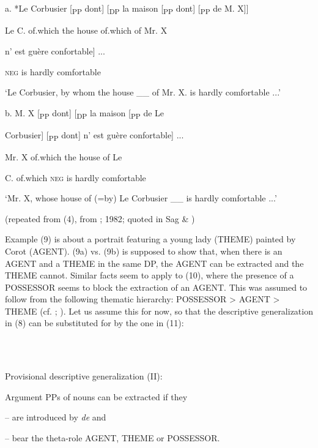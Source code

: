 \documentclass[output=paper]{langsci/langscibook}
\begin{document}
\ea%
    \label{ex:key:10}
    \gll\\
        \\
    \glt
    \z

            a.   *Le Corbusier [\textsubscript{PP} dont] [\textsubscript{DP}  la  maison [\textsubscript{PP}  dont] [\textsubscript{PP}  de  M.  X]]

    Le C.                 of.which  the  house    of.which  of   Mr. X

    n’  est  guère  confortable] ...

    \textsc{neg}  is  hardly  comfortable

    ‘Le Corbusier, by whom the house \_\_ of Mr. X. is hardly comfortable ...’

b.  M.  X  [\textsubscript{PP} dont]\textsubscript{} [\textsubscript{DP}    la  maison  [\textsubscript{PP}  de  Le 

Corbusier] [\textsubscript{PP} dont]   n’  est  guère  confortable] ...

    Mr.  X    of.which  the  house      of  Le

C.      of.which   \textsc{neg}  is  hardly  comfortable

    ‘Mr. X, whose house of (=by) Le Corbusier \_\_ is hardly comfortable ...’

    (repeated from (4), from \citealt{Milner1978b}; 1982; quoted in Sag \& \citealt{Godard1994})

Example (9) is about a portrait featuring a young lady (THEME) painted by Corot (AGENT). (9a) vs. (9b) is supposed to show that, when there is an AGENT and a THEME in the same DP, the AGENT can be extracted and the THEME cannot. Similar facts seem to apply to (10), where the presence of a POSSESSOR seems to block the extraction of an AGENT. This was assumed to follow from the following thematic hierarchy: POSSESSOR > AGENT > THEME (cf. \citealt{Pollock1989}; \citealt{Godard1992}). Let us assume this for now, so that the descriptive generalization in (8) can be substituted for by the one in (11):

\ea%
    \label{ex:key:11}
    \gll\\
        \\
    \glt
    \z

          Provisional descriptive generalization (II):

  Argument PPs of nouns can be extracted if they

    – are introduced by \textit{de} and

    – bear the theta-role AGENT, THEME or POSSESSOR.
\end{document}
